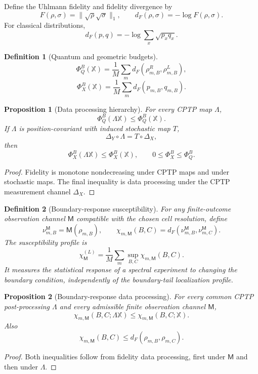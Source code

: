 \documentclass[11pt]{article}
\newtheorem{definition}{Definition}
\newtheorem{proposition}{Proposition}
\begin{document}
Define the Uhlmann fidelity and fidelity divergence by
\[
F(\rho,\sigma)=\|\sqrt\rho\sqrt\sigma\|_1,
\qquad
 d_F(\rho,\sigma)=-\log F(\rho,\sigma).
\]
For classical distributions,
\[
d_F(p,q)=-\log\sum_x\sqrt{p_xq_x}.
\]

\begin{definition}[Quantum and geometric budgets]
\[
\Phi_Q^B(\mathbb X)
=\frac1M\sum_m d_F(\rho_{m,B}^R,\rho_{m,B}^L),
\]
\[
\Phi_X^B(\mathbb X)
=\frac1M\sum_m d_F(p_{m,B},q_{m,B}).
\]
\end{definition}

\begin{proposition}[Data processing hierarchy]
For every CPTP map $\Lambda$,
\[
\Phi_Q^B(\Lambda\mathbb X)\le\Phi_Q^B(\mathbb X).
\]
If $\Lambda$ is position-covariant with induced stochastic map $T$,
\[
\Delta_Y\circ\Lambda=T\circ\Delta_X,
\]
then
\[
\Phi_X^B(\Lambda\mathbb X)\le\Phi_X^B(\mathbb X),
\qquad
0\le\Phi_X^B\le\Phi_Q^B.
\]
\end{proposition}

\begin{proof}
Fidelity is monotone nondecreasing under CPTP maps and under stochastic maps. The final inequality is data processing under the CPTP measurement channel $\Delta_X$.
\end{proof}

\begin{definition}[Boundary-response susceptibility]
For any finite-outcome observation channel $\mathsf M$ compatible with the chosen cell
resolution, define
\[
\nu_{m,B}^{\mathsf M}=\mathsf M(\rho_{m,B}),
\qquad
\chi_{m,\mathsf M}(B,C)=d_F(\nu_{m,B}^{\mathsf M},\nu_{m,C}^{\mathsf M}).
\]
The susceptibility profile is
\[
\chi_{\mathsf M}^{(L)}=\frac1M\sum_m\sup_{B,C}\chi_{m,\mathsf M}(B,C).
\]
It measures the statistical response of a spectral experiment to changing the boundary
condition, independently of the boundary-tail localization profile.
\end{definition}

\begin{proposition}[Boundary-response data processing]
For every common CPTP post-processing $\Lambda$ and every admissible finite observation channel
$\mathsf M$,
\[
\chi_{m,\mathsf M}(B,C;\Lambda\mathbb X)\le
\chi_{m,\mathsf M}(B,C;\mathbb X).
\]
Also
\[
\chi_{m,\mathsf M}(B,C)\le d_F(\rho_{m,B},\rho_{m,C}).
\]
\end{proposition}

\begin{proof}
Both inequalities follow from fidelity data processing, first under $\mathsf M$ and then under
$\Lambda$.
\end{proof}
\end{document}
